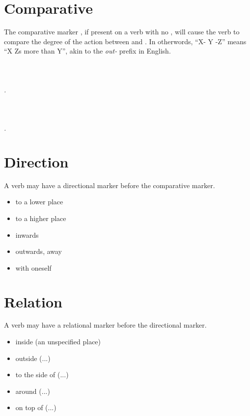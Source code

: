 \documentclass{book}
\begin{document}
\section{Comparative}

\label{sec:comparative}

The comparative marker , if present on a verb with no , will cause the verb to compare the degree of the action between  and . In otherwords, ``X- Y -Z'' means ``X Zs more than Y'', akin to the \emph{out-} prefix in English. \\
~\\
  \\
  \\
\emph{ .} \\
~\\
   \\
   \\
\emph{   .}

\section{Direction}

A verb may have a directional marker before the comparative marker.

\begin{itemize}
    \item {} to a lower place
    \item {} to a higher place
    \item {} inwards
    \item {} outwards, away
    \item {} with oneself
\end{itemize}

\section{Relation}

A verb may have a relational marker before the directional marker.

\begin{itemize}
    \item {} inside (an unspecified place)
    \item {} outside (...)
    \item {} to the side of (...)
    \item {} around (...)
    \item {} on top of (...)
\end{itemize}
\end{document}
